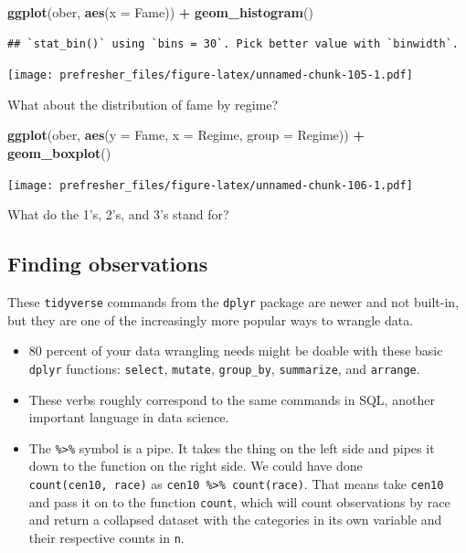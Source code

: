 \documentclass[]{book}
\newenvironment{Shaded}{\begin{snugshade}}{\end{snugshade}}
\newcommand{\KeywordTok}[1]{\textcolor[rgb]{0.13,0.29,0.53}{\textbf{#1}}}
\newcommand{\DataTypeTok}[1]{\textcolor[rgb]{0.13,0.29,0.53}{#1}}
\newcommand{\StringTok}[1]{\textcolor[rgb]{0.31,0.60,0.02}{#1}}
\newcommand{\OperatorTok}[1]{\textcolor[rgb]{0.81,0.36,0.00}{\textbf{#1}}}
\newcommand{\NormalTok}[1]{#1}
\providecommand{\tightlist}{%
  \setlength{\itemsep}{0pt}\setlength{\parskip}{0pt}}
\theoremstyle{definition}
\theoremstyle{definition}
\theoremstyle{definition}
\theoremstyle{remark}
\begin{document}
\begin{Shaded}
\begin{Highlighting}[]
\KeywordTok{ggplot}\NormalTok{(ober, }\KeywordTok{aes}\NormalTok{(}\DataTypeTok{x =}\NormalTok{ Fame)) }\OperatorTok{+}\StringTok{ }\KeywordTok{geom_histogram}\NormalTok{()}
\end{Highlighting}
\end{Shaded}

\begin{verbatim}
## `stat_bin()` using `bins = 30`. Pick better value with `binwidth`.
\end{verbatim}

\texttt{[image: prefresher\_files/figure-latex/unnamed-chunk-105-1.pdf]}

What about the distribution of fame by regime?

\begin{Shaded}
\begin{Highlighting}[]
\KeywordTok{ggplot}\NormalTok{(ober, }\KeywordTok{aes}\NormalTok{(}\DataTypeTok{y =}\NormalTok{ Fame, }\DataTypeTok{x =}\NormalTok{ Regime, }\DataTypeTok{group =}\NormalTok{ Regime)) }\OperatorTok{+}
\StringTok{  }\KeywordTok{geom_boxplot}\NormalTok{()}
\end{Highlighting}
\end{Shaded}

\texttt{[image: prefresher\_files/figure-latex/unnamed-chunk-106-1.pdf]}

What do the 1's, 2's, and 3's stand for?

\subsection{Finding observations}\label{finding-observations}

These \texttt{tidyverse} commands from the \texttt{dplyr} package are
newer and not built-in, but they are one of the increasingly more
popular ways to wrangle data.

\begin{itemize}
\tightlist
\item
  80 percent of your data wrangling needs might be doable with these
  basic \texttt{dplyr} functions: \texttt{select}, \texttt{mutate},
  \texttt{group\_by}, \texttt{summarize}, and \texttt{arrange}.
\item
  These verbs roughly correspond to the same commands in SQL, another
  important language in data science.
\item
  The \texttt{\%\textgreater{}\%} symbol is a pipe. It takes the thing
  on the left side and pipes it down to the function on the right side.
  We could have done \texttt{count(cen10,\ race)} as
  \texttt{cen10\ \%\textgreater{}\%\ count(race)}. That means take
  \texttt{cen10} and pass it on to the function \texttt{count}, which
  will count observations by race and return a collapsed dataset with
  the categories in its own variable and their respective counts in
  \texttt{n}.
\end{itemize}
\end{document}
